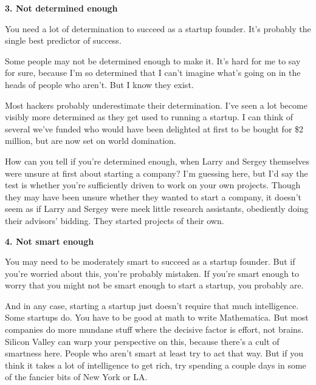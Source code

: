 \textbf{3. Not determined enough}

You need a lot of determination to succeed as a
                    startup founder. It's probably the single best predictor of
                    success.

Some people may not be determined enough
                    to make it. It's hard for me to say for sure, because I'm so
                    determined that I can't imagine what's going on in the heads
                    of people who aren't. But I know they exist.

Most
                    hackers probably underestimate their determination. I've
                    seen a lot become visibly more determined as they get used
                    to running a startup. I can think of several we've funded
                    who would have been delighted at first to be bought for \$2
                    million, but are now set on world domination.

How
                    can you tell if you're determined enough, when Larry and
                    Sergey themselves were unsure at first about starting a
                    company? I'm guessing here, but I'd say the test is whether
                    you're sufficiently driven to work on your own projects.
                    Though they may have been unsure whether they wanted to
                    start a company, it doesn't seem as if Larry and Sergey were
                    meek little research assistants, obediently doing their
                    advisors' bidding. They started projects of their own.


                    \textbf{4. Not smart enough}

You may need to be
                    moderately smart to succeed as a startup founder. But if
                    you're worried about this, you're probably mistaken. If
                    you're smart enough to worry that you might not be smart
                    enough to start a startup, you probably are.

And
                    in any case, starting a startup just doesn't require that
                    much intelligence. Some startups do. You have to be good at
                    math to write Mathematica. But most companies do more
                    mundane stuff where the decisive factor is effort, not
                    brains. Silicon Valley can warp your perspective on this,
                    because there's a cult of smartness here. People who aren't
                    smart at least try to act that way. But if you think it
                    takes a lot of intelligence to get rich, try spending a
                    couple days in some of the fancier bits of New York or
                    LA.

